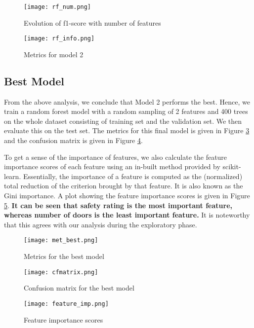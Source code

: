 \documentclass[conference]{IEEEtran}
\begin{document}
\begin{figure}[tbh]
\centering
\texttt{[image: rf\_num.png]}
\caption{Evolution of f1-score with number of features}
\label{rf_num}
\end{figure}

\begin{figure}[tbh]
\centering
\texttt{[image: rf\_info.png]}
\caption{Metrics for model 2 }
\label{rf_info}
\end{figure}


\subsection{Best Model}

From the above analysis, we conclude that Model 2 performs the best. Hence, we train a random forest model with a random sampling of 2 features and 400 trees on the whole dataset consisting of training set and the validation set. We then evaluate this on the test set. The metrics for this final model is given in Figure \ref{met_best} and the confusion matrix is given in Figure \ref{cf_matrix}. 

To get a sense of the importance of features, we also calculate the feature importance scores of each feature using an in-built method provided by scikit-learn. Essentially, the importance of a feature is computed as the (normalized) total reduction of the criterion brought by that feature. It is also known as the Gini importance. A plot showing the feature importance scores is given in Figure \ref{feature_imp}. \textbf{It can be seen that safety rating is the most important feature, whereas number of doors is the least important feature.} It is noteworthy that this agrees with our analysis during the exploratory phase.

\begin{figure}[tbh]
\centering
\texttt{[image: met\_best.png]}
\caption{Metrics for the best model }
\label{met_best}
\end{figure}

\begin{figure}[tbh]
\centering
\texttt{[image: cfmatrix.png]}
\caption{Confusion matrix for the best model}
\label{cf_matrix}
\end{figure}

\begin{figure}[tbh]
\centering
\texttt{[image: feature\_imp.png]}
\caption{Feature importance scores}
\label{feature_imp}
\end{figure}
\end{document}
